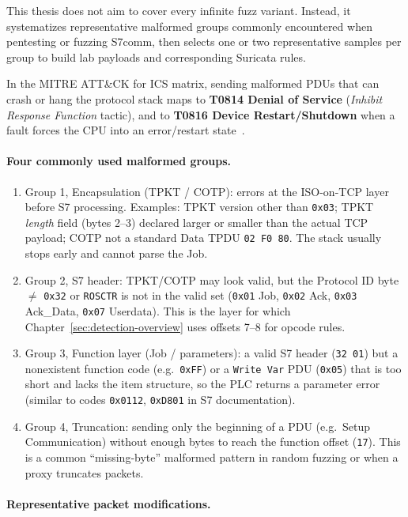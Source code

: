 ﻿\documentclass[../main.tex]{subfiles}
\begin{document}
This thesis does not aim to cover every infinite fuzz variant. Instead, it systematizes representative malformed groups commonly encountered when pentesting or fuzzing S7comm, then selects one or two representative samples per group to build lab payloads and corresponding Suricata rules.

In the MITRE ATT\&CK for ICS matrix, sending malformed PDUs that can crash or hang the protocol stack maps to \textbf{T0814 Denial of Service} (\emph{Inhibit Response Function} tactic), and to \textbf{T0816 Device Restart/Shutdown} when a fault forces the CPU into an error/restart state~\cite{mitre_ics_attack}.

\paragraph{Four commonly used malformed groups.}

\begin{enumerate}
    \item Group 1, Encapsulation (TPKT / COTP): errors at the ISO-on-TCP layer before S7 processing. Examples: TPKT version other than \texttt{0x03}; TPKT \emph{length} field (bytes 2--3) declared larger or smaller than the actual TCP payload; COTP not a standard Data TPDU \texttt{02 F0 80}. The stack usually stops early and cannot parse the Job.
    \item Group 2, S7 header: TPKT/COTP may look valid, but the Protocol ID byte $\neq$ \texttt{0x32} or \texttt{ROSCTR} is not in the valid set (\texttt{0x01} Job, \texttt{0x02} Ack, \texttt{0x03} Ack\_Data, \texttt{0x07} Userdata). This is the layer for which Chapter~\ref{sec:detection-overview} uses offsets 7--8 for opcode rules.
    \item Group 3, Function layer (Job / parameters): a valid S7 header (\texttt{32 01}) but a nonexistent function code (e.g.\ \texttt{0xFF}) or a \texttt{Write Var} PDU (\texttt{0x05}) that is too short and lacks the item structure, so the PLC returns a parameter error (similar to codes \texttt{0x0112}, \texttt{0xD801} in S7 documentation).
    \item Group 4, Truncation: sending only the beginning of a PDU (e.g.\ Setup Communication) without enough bytes to reach the function offset (\texttt{17}). This is a common ``missing-byte'' malformed pattern in random fuzzing or when a proxy truncates packets.
\end{enumerate}

\paragraph{Representative packet modifications.}
\end{document}
